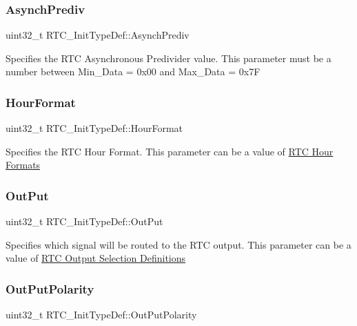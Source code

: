\subsubsection{\texorpdfstring{Asynch\+Prediv}{AsynchPrediv}}
{\footnotesize\ttfamily uint32\+\_\+t R\+T\+C\+\_\+\+Init\+Type\+Def\+::\+Asynch\+Prediv}

Specifies the R\+TC Asynchronous Predivider value. This parameter must be a number between Min\+\_\+\+Data = 0x00 and Max\+\_\+\+Data = 0x7F \mbox{\label{struct_r_t_c___init_type_def_aa7dff3583cd79a5a3f9868a56ffd31ee}} 
\subsubsection{\texorpdfstring{Hour\+Format}{HourFormat}}
{\footnotesize\ttfamily uint32\+\_\+t R\+T\+C\+\_\+\+Init\+Type\+Def\+::\+Hour\+Format}

Specifies the R\+TC Hour Format. This parameter can be a value of \hyperlink{group___r_t_c___hour___formats}{R\+TC Hour Formats} \mbox{\label{struct_r_t_c___init_type_def_acd1593d55123feca6c3cae142134c294}} 
\subsubsection{\texorpdfstring{Out\+Put}{OutPut}}
{\footnotesize\ttfamily uint32\+\_\+t R\+T\+C\+\_\+\+Init\+Type\+Def\+::\+Out\+Put}

Specifies which signal will be routed to the R\+TC output. This parameter can be a value of \hyperlink{group___r_t_c___output__selection___definitions}{R\+TC Output Selection Definitions} \mbox{\label{struct_r_t_c___init_type_def_a14365da1f80863621341cf4a6a8d4e67}} 
\subsubsection{\texorpdfstring{Out\+Put\+Polarity}{OutPutPolarity}}
{\footnotesize\ttfamily uint32\+\_\+t R\+T\+C\+\_\+\+Init\+Type\+Def\+::\+Out\+Put\+Polarity}

